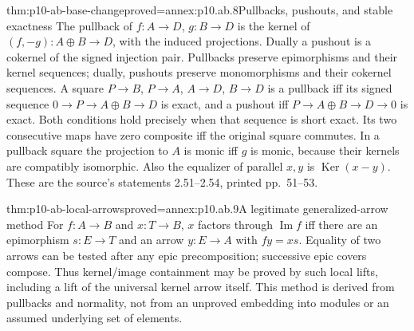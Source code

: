 \begin{hbtheorem}{thm:p10-ab-base-change}{proved=annex:p10.ab.8}{Pullbacks, pushouts, and stable exactness}
The pullback of \(f:A\to D\), \(g:B\to D\) is the kernel of
\((f,-g):A\oplus B\to D\), with the induced projections.
Dually a pushout is a cokernel of the signed injection pair.
Pullbacks preserve epimorphisms and their kernel sequences; dually,
pushouts preserve monomorphisms and their cokernel sequences.
A square \(P\to B\), \(P\to A\), \(A\to D\), \(B\to D\)
is a pullback iff its signed sequence
\(0\to P\to A\oplus B\to D\) is exact, and a pushout iff
\(P\to A\oplus B\to D\to0\) is exact. Both conditions hold
precisely when that sequence is short exact. Its two consecutive maps
have zero composite iff the original square commutes. In a pullback
square the projection to \(A\) is monic iff \(g\) is monic,
because their kernels are compatibly isomorphic. Also the equalizer
of parallel \(x,y\) is \(\operatorname{Ker}(x-y)\).
These are the source's statements 2.51--2.54, printed pp.~51--53.
\end{hbtheorem}

\begin{hbtheorem}{thm:p10-ab-local-arrows}{proved=annex:p10.ab.9}{A legitimate generalized-arrow method}
For \(f:A\to B\) and \(x:T\to B\), \(x\) factors through
\(\operatorname{Im}f\) iff there are an epimorphism \(s:E\to T\)
and an arrow \(y:E\to A\) with \(fy=xs\).
Equality of two arrows can be tested after any epic precomposition;
successive epic covers compose. Thus kernel/image containment may be
proved by such local lifts, including a lift of the universal kernel arrow
itself. This method is derived from pullbacks and normality, not from
an unproved embedding into modules or an assumed underlying set of elements.
\end{hbtheorem}

